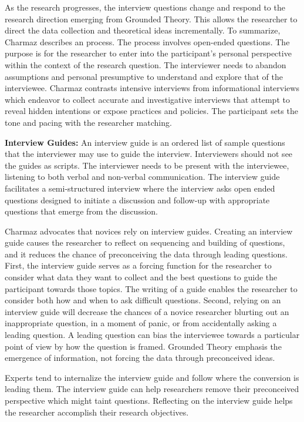 As the research progresses, the interview questions change and respond to the research direction emerging from Grounded Theory. This allows the researcher to direct the data collection and theoretical ideas incrementally.
To summarize, Charmaz describes an  process. The process involves open-ended questions. The purpose is for the researcher to enter into the participant's personal perspective within the context of the research question. The interviewer needs to abandon assumptions and personal presumptive to understand and explore that of the interviewee. Charmaz contrasts intensive interviews from informational interviews which endeavor to collect accurate  and investigative interviews that attempt to reveal hidden intentions or expose practices and policies. The participant sets the tone and pacing with the researcher matching. 

\textbf{Interview Guides:} An interview guide is an ordered list of sample questions that the interviewer may use to guide the interview. Interviewers should not see the guides as scripts. The interviewer needs to be present with the interviewee, listening to both verbal and non-verbal communication. The interview guide facilitates a semi-structured interview where the interview asks open ended questions designed to initiate a discussion and follow-up with appropriate questions that emerge from the discussion.

Charmaz advocates that novices rely on interview guides. Creating an interview guide causes the researcher to reflect on sequencing and building of questions, and it reduces the chance of preconceiving the data through leading questions. First, the interview guide serves as a forcing function for the researcher to consider what data they want to collect and the best questions to guide the participant towards those topics. The writing of a guide enables the researcher to consider both how and when to ask difficult questions. Second, relying on an interview guide will decrease the chances of a novice researcher blurting out an inappropriate question, in a moment of panic, or from accidentally asking a leading question. A leading question can bias the interviewee towards a particular point of view by how the question is framed. Grounded Theory emphasis the emergence of information, not forcing the data through preconceived ideas. 

Experts tend to internalize the interview guide and follow where the conversion is leading them. The interview guide can help researchers remove their preconceived perspective which might taint questions. Reflecting on the interview guide helps the researcher accomplish their research objectives. 

